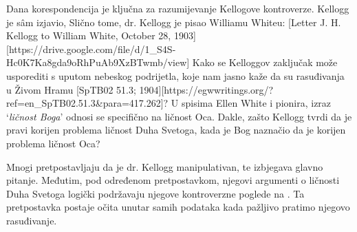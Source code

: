 Dana korespondencija je ključna za razumijevanje Kellogove kontroverze. Kellogg je sâm izjavio,  Slično tome, dr. Kellogg je pisao Williamu Whiteu: [Letter J. H. Kellogg to William White, October 28, 1903][https://drive.google.com/file/d/1\_S4S-Hc0K7Ka8gda9oRhPuAb9XzBTwmb/view] Kako se Kelloggov zaključak može usporediti s uputom nebeskog podrijetla, koje nam jasno kaže da su rasuđivanja u Živom Hramu [SpTB02 51.3; 1904][https://egwwritings.org/?ref=en\_SpTB02.51.3&para=417.262]? U spisima Ellen White i pionira, izraz ‘\textit{ličnost Boga}’ odnosi se specifično na ličnost Oca. Dakle, zašto Kellogg tvrdi da je pravi korijen problema ličnost Duha Svetoga, kada je Bog naznačio da je korijen problema ličnost Oca?

Mnogi pretpostavljaju da je dr. Kellogg manipulativan, te izbjegava glavno pitanje. Međutim, pod određenom pretpostavkom, njegovi argumenti o ličnosti Duha Svetoga logički podržavaju njegove kontroverzne poglede na . Ta pretpostavka postaje očita unutar samih podataka kada pažljivo pratimo njegovo rasuđivanje.

